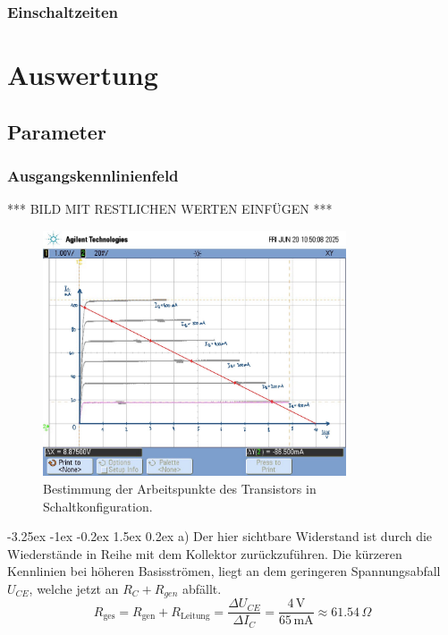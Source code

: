 \documentclass[
	a4paper, %
	12pt, %
]{CSUniSchoolLabReport}
\makeatletter
\renewcommand\paragraph{\@startsection{paragraph}{4}{\z@}%
  {-3.25ex \@plus -1ex \@minus -0.2ex}%
  {1.5ex \@plus 0.2ex}%
  {\normalfont\normalsize\bfseries}}
\makeatother
\begin{document}
\subsubsection{Einschaltzeiten}

\section{Auswertung}
\subsection{Parameter}
\subsubsection{Ausgangskennlinienfeld}


\vspace{1em}
*** BILD MIT RESTLICHEN WERTEN EINFÜGEN ***
\begin{figure}[H]
	\centering
	\includegraphics[width=0.8\textwidth]{Figures/scope_4_eingangskennlinie_C.3.1..jpg}
	\caption{Bestimmung der Arbeitspunkte des Transistors in Schaltkonfiguration.}
	\label{fig:arbeitspunkte schaltkonfiguration}
\end{figure}

\paragraph{a)}
Der hier sichtbare Widerstand ist durch die Wiederstände in Reihe mit dem Kollektor zurückzuführen. Die kürzeren Kennlinien bei höheren Basisströmen, liegt an dem geringeren Spannungsabfall $U_{CE}$, welche jetzt an $R_C + R_{gen}$ abfällt. 
\[
R_{\text{ges}} = R_{\text{gen}} + R_{\text{Leitung}} = \frac{\Delta U_{CE}}{\Delta I_C} = \frac{4\,\mathrm{V}}{65\,\mathrm{mA}} \approx 61.54\,\Omega
\]
\end{document}
